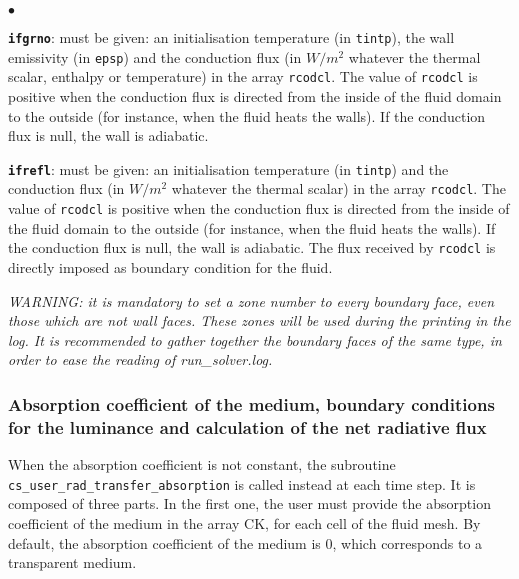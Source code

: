 {{{\begin{list}{$\bullet$}{}
\item \texttt{\textbf{ifgrno}}: must be given: an initialisation temperature (in
      \texttt{tintp}), the wall emissivity (in \texttt{epsp}) and the conduction
      flux (in $W/m^2$ whatever the thermal scalar, enthalpy or temperature) in
      the array \texttt{rcodcl}. The value of \texttt{rcodcl} is positive when the
      conduction flux is directed from the inside of the fluid domain to the
      outside (for instance, when the fluid heats the walls). If the
      conduction flux is null, the wall is adiabatic.

\item \texttt{\textbf{ifrefl}}: must be given: an initialisation temperature (in
      \texttt{tintp}) and the conduction flux (in $W/m^2$ whatever the thermal
      scalar) in the array \texttt{rcodcl}. The value of \texttt{rcodcl} is
      positive when the conduction flux is directed from the inside of the
      fluid domain to the outside (for instance, when the fluid heats the
      walls). If the conduction flux is null, the wall is adiabatic. The flux
      received by \texttt{rcodcl} is directly imposed as boundary condition for
      the fluid.

\end{list}

\noindent
{\em WARNING: it is mandatory to set a zone number to every boundary
face, even those which are not wall faces. These zones will be used during the
printing in the log. It is recommended to gather together the
boundary faces of the same type, in order to ease the reading of
run\_solver.log.}\\

\subsubsection{Absorption coefficient of the medium, boundary conditions
   for the luminance and calculation of the net radiative flux}

When the absorption coefficient is not constant, the subroutine
\texttt{cs\_user\_rad\_transfer\_absorption} is called instead at each time
step. It is composed of three parts. In the first one, the user
must provide the absorption coefficient of the medium in the array CK,
for each cell of the fluid mesh. By default, the absorption coefficient
of the medium is 0, which corresponds to a transparent medium.\\

}}}
